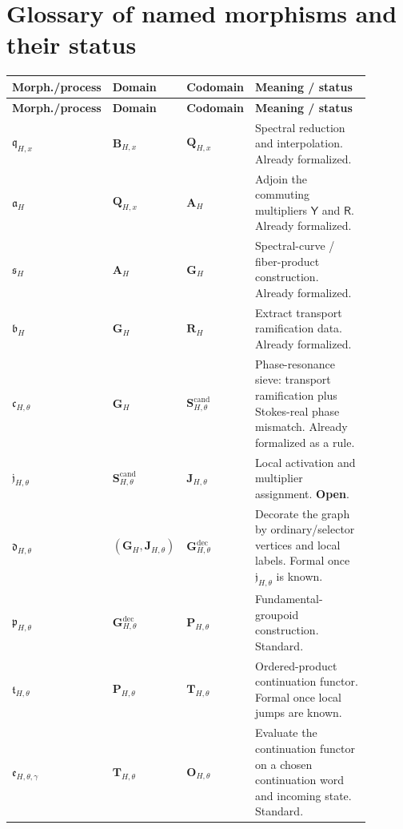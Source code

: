 \documentclass[11pt]{article}
\newcommand{\Yop}{\mathsf Y}
\newcommand{\Rop}{\mathsf R}
\begin{document}
\section{Glossary of named morphisms and their status}

\small
\begin{longtable}{P{0.15\linewidth}P{0.18\linewidth}P{0.18\linewidth}P{0.38\linewidth}}
\toprule
\textbf{Morph./process} & \textbf{Domain} & \textbf{Codomain} & \textbf{Meaning / status}\\
\midrule
\endfirsthead
\toprule
\textbf{Morph./process} & \textbf{Domain} & \textbf{Codomain} & \textbf{Meaning / status}\\
\midrule
\endhead
$\mathfrak q_{H,x}$ & $\mathbf B_{H,x}$ & $\mathbf Q_{H,x}$ & Spectral reduction and interpolation. Already formalized.\\
$\mathfrak a_H$ & $\mathbf Q_{H,x}$ & $\mathbf A_H$ & Adjoin the commuting multipliers $\Yop$ and $\Rop$. Already formalized.\\
$\mathfrak s_H$ & $\mathbf A_H$ & $\mathbf G_H$ & Spectral-curve / fiber-product construction. Already formalized.\\
$\mathfrak b_H$ & $\mathbf G_H$ & $\mathbf R_H$ & Extract transport ramification data. Already formalized.\\
$\mathfrak c_{H,\theta}$ & $\mathbf G_H$ & $\mathbf S^{\mathrm{cand}}_{H,\theta}$ & Phase-resonance sieve: transport ramification plus Stokes-real phase mismatch. Already formalized as a rule.\\
$\mathfrak j_{H,\theta}$ & $\mathbf S^{\mathrm{cand}}_{H,\theta}$ & $\mathbf J_{H,\theta}$ & Local activation and multiplier assignment. \textbf{Open}.\\
$\mathfrak d_{H,\theta}$ & $(\mathbf G_H,\mathbf J_{H,\theta})$ & $\mathbf G^{\mathrm{dec}}_{H,\theta}$ & Decorate the graph by ordinary/selector vertices and local labels. Formal once $\mathfrak j_{H,\theta}$ is known.\\
$\mathfrak p_{H,\theta}$ & $\mathbf G^{\mathrm{dec}}_{H,\theta}$ & $\mathbf P_{H,\theta}$ & Fundamental-groupoid construction. Standard.\\
$\mathfrak t_{H,\theta}$ & $\mathbf P_{H,\theta}$ & $\mathbf T_{H,\theta}$ & Ordered-product continuation functor. Formal once local jumps are known.\\
$\mathfrak e_{H,\theta,\gamma}$ & $\mathbf T_{H,\theta}$ & $\mathbf O_{H,\theta}$ & Evaluate the continuation functor on a chosen continuation word and incoming state. Standard.\\
\bottomrule
\end{longtable}
\normalsize
\end{document}
